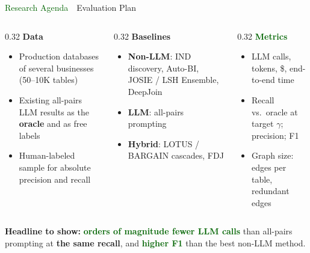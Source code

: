 \documentclass[aspectratio=169]{beamer}
\newcommand{\hred}[1]{\textcolor{tug}{\textbf{#1}}}
\newcommand{\hgreen}[1]{\textcolor{darkgreen}{\textbf{#1}}}
\newcommand{\hblue}[1]{\textcolor{tugb}{\textbf{#1}}}
\newcommand{\apptitle}[3]{\textcolor{#1}{#2}~\textcolor{black!30}{\textbar}~#3}
\begin{document}
\begin{frame}{\apptitle{darkgreen}{Research Agenda}{Evaluation Plan}}
\footnotesize
\vspace{2mm}
\begin{columns}[T]
\begin{column}{0.32\textwidth}
\textbf{\hblue{Data}}
\begin{itemize}\setlength\itemsep{3pt}
  \item Production databases of several businesses (50--10K tables)
  \item Existing all-pairs LLM results as the \textbf{oracle} and as free labels
  \item Human-labeled sample for absolute precision and recall
\end{itemize}
\end{column}
\begin{column}{0.32\textwidth}
\textbf{\hred{Baselines}}
\begin{itemize}\setlength\itemsep{3pt}
  \item \textbf{Non-LLM}: IND discovery, Auto-BI, JOSIE / LSH Ensemble, DeepJoin
  \item \textbf{LLM}: all-pairs prompting
  \item \textbf{Hybrid}: LOTUS / BARGAIN cascades, FDJ
\end{itemize}
\end{column}
\begin{column}{0.32\textwidth}
\textbf{\hgreen{Metrics}}
\begin{itemize}\setlength\itemsep{3pt}
  \item LLM calls, tokens, \$, end-to-end time
  \item Recall vs.\ oracle at target $\gamma$; precision; F1
  \item Graph size: edges per table, redundant edges
\end{itemize}
\end{column}
\end{columns}

\vspace{5mm}
\begin{exampleblock}{}
\vspace{0.5mm}
\centering
\textbf{Headline to show:} \hgreen{orders of magnitude fewer LLM calls} than all-pairs prompting at \textbf{the same recall}, and \hgreen{higher F1} than the best non-LLM method.
\vspace{0.5mm}
\end{exampleblock}
\end{frame}
\end{document}
